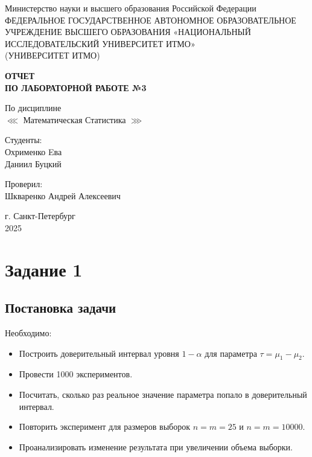 \documentclass[14pt]{extreport}
\begin{document}
\begin{titlepage}
    \centering
    \vspace*{1cm}

    {\large Министерство науки и высшего образования Российской Федерации}\\
    {\large ФЕДЕРАЛЬНОЕ ГОСУДАРСТВЕННОЕ АВТОНОМНОЕ ОБРАЗОВАТЕЛЬНОЕ УЧРЕЖДЕНИЕ ВЫСШЕГО ОБРАЗОВАНИЯ «НАЦИОНАЛЬНЫЙ ИССЛЕДОВАТЕЛЬСКИЙ УНИВЕРСИТЕТ ИТМО»}\\
    {\large (УНИВЕРСИТЕТ ИТМО)}\\

    \vspace{1cm}

    \textbf{{\Huge ОТЧЕТ}\\
    {\Huge ПО ЛАБОРАТОРНОЙ РАБОТЕ №3}}\\

    \vspace{1cm}

    {\LARGE По дисциплине\\
     \(\lll\) Математическая Статистика \(\ggg\) }\\

    \vspace{2cm}

    {\Large Студенты:}\\
    Охрименко Eва\\
    Даниил Буцкий


    \vspace{2cm}

    {\Large Проверил:}\\
    Шкваренко Андрей Алексеевич\\

    \vspace{2cm}

    {\large г. Санкт-Петербург}\\
    {\large 2025}

\end{titlepage}


\chapter*{Задание 1}

\section*{Постановка задачи}

Необходимо:
\begin{itemize}
    \item Построить доверительный интервал уровня $1 - \alpha$ для параметра $\tau = \mu_1 - \mu_2$.
    \item Провести 1000 экспериментов.
    \item Посчитать, сколько раз реальное значение параметра попало в доверительный интервал.
    \item Повторить эксперимент для размеров выборок $n = m = 25$ и $n = m = 10000$.
    \item Проанализировать изменение результата при увеличении объема выборки.
\end{itemize}
\end{document}
